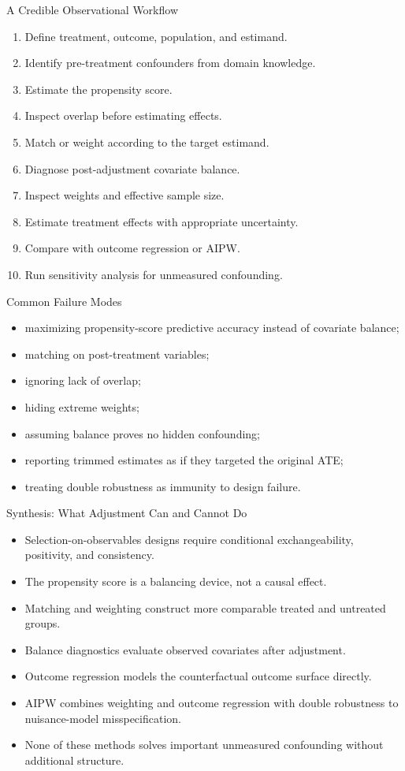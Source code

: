\documentclass[aspectratio=169,11pt]{beamer}
\begin{document}
\begin{frame}{A Credible Observational Workflow}
\begin{enumerate}
\item Define treatment, outcome, population, and estimand.
\item Identify pre-treatment confounders from domain knowledge.
\item Estimate the propensity score.
\item Inspect overlap before estimating effects.
\item Match or weight according to the target estimand.
\item Diagnose post-adjustment covariate balance.
\item Inspect weights and effective sample size.
\item Estimate treatment effects with appropriate uncertainty.
\item Compare with outcome regression or AIPW.
\item Run sensitivity analysis for unmeasured confounding.
\end{enumerate}
\end{frame}

\begin{frame}{Common Failure Modes}
\begin{itemize}
\item maximizing propensity-score predictive accuracy instead of covariate balance;
\item matching on post-treatment variables;
\item ignoring lack of overlap;
\item hiding extreme weights;
\item assuming balance proves no hidden confounding;
\item reporting trimmed estimates as if they targeted the original ATE;
\item treating double robustness as immunity to design failure.
\end{itemize}
\end{frame}

\begin{frame}{Synthesis: What Adjustment Can and Cannot Do}
\begin{itemize}
\item Selection-on-observables designs require conditional exchangeability, positivity, and consistency.
\item The propensity score is a balancing device, not a causal effect.
\item Matching and weighting construct more comparable treated and untreated groups.
\item Balance diagnostics evaluate observed covariates after adjustment.
\item Outcome regression models the counterfactual outcome surface directly.
\item AIPW combines weighting and outcome regression with double robustness to nuisance-model misspecification.
\item None of these methods solves important unmeasured confounding without additional structure.
\end{itemize}
\end{frame}
\end{document}
